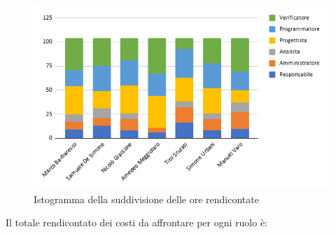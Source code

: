         \begin{figure}[!h]
            \vspace{5px}
            \includegraphics[scale=0.6]{../../../Images/Diagrammi/Istogrammi/ore rendicontate.png}
            \centering
            \caption{Istogramma della suddivisione delle ore rendicontate}
        \end{figure}
        
        Il totale rendicontato dei costi da affrontare per ogni ruolo è:


